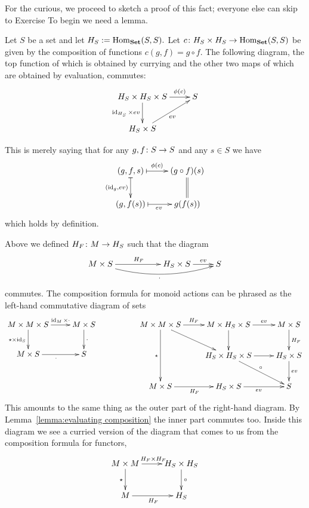 \documentclass[../main/CT4S-EN-RU]{subfiles}
\begin{document}
\begin{blockENG}
For the curious, we proceed to sketch a proof of this fact; everyone else can skip to Exercise %
To begin we need a lemma.
\end{blockENG}

\begin{blockRUS}
\end{blockRUS}

\begin{lemmaENG}\label{lemma:evaluating composition}
Let $S$ be a set and let $H_S:=\operatorname{Hom}_{\mathbf{Set}}(S,S).$ Let $c\colon H_S\times H_S\rightarrow\operatorname{Hom}_{\mathbf{Set}}(S,S)$ be given by the composition of functions $c(g,f)=g\circ f.$ The following diagram, the top function of which is obtained by currying and the other two maps of which are obtained by evaluation, commutes: 
$$
\xymatrix{H_S\times H_S\times S\ar[r]^-{\phi(c)}\ar[d]_{\id_{H_S}\times ev}&S\\H_S\times S\ar[ur]_{ev}}
$$
\end{lemmaENG}

\begin{lemmaRUS}\label{lemma:evaluating composition}
\end{lemmaRUS}

\begin{proofENG}
This is merely saying that for any $g,f\colon S\rightarrow S$ and any $s\in S$ we have 
$$
\xymatrix{(g,f,s)\ar@{|->}[r]^-{\phi(c)}\ar@{|->}[d]_{(\id_g,ev)}&(g\circ f)(s)\ar@{=}[d]\\(g,f(s))\ar@{|->}[r]_{ev}&g(f(s))}
$$
which holds by definition.
\end{proofENG}

\begin{proofRUS}
\end{proofRUS}

\begin{blockENG}
Above we defined $H_F\colon M\rightarrow H_S$ such that the diagram 
$$
\xymatrix{M\times S\ar[rr]^{H_F}\ar@/_1pc/[rrr]_{\cdot}&&H_S\times S\ar[r]^-{ev}&S}
$$
commutes. The composition formula for monoid actions can be phrased as the left-hand commutative diagram of sets
$$
\xymatrix{M\times M\times S\ar[r]^-{\id_M\times\cdot}\ar[d]_{\star\times\id_S}&M\times S\ar[d]^\cdot\\M\times S\ar[r]_\cdot&S}
\hspace{.7in}
\xymatrix@=25pt{
M\times M\times S\ar[rd]\ar[r]^-{H_F}\ar[dd]_{\star}&M\times H_S\times S\ar[d]\ar[r]^-{ev}&M\times S\ar[d]^{H_F}\\
&H_S\times H_S\times S\ar[r]\ar[rd]^\circ&H_S\times S\ar[d]^{ev}\\
M\times S\ar[r]_{H_F}&H_S\times S\ar[r]_{ev}&S}
$$
This amounts to the same thing as the outer part of the right-hand diagram. By Lemma~\ref{lemma:evaluating composition} the inner part commutes too. Inside this diagram we see a curried version of the diagram that comes to us from the composition formula for functors,
$$
\xymatrix{M\times M\ar[r]^{H_F\times H_F}\ar[d]_\star&H_S\times H_S\ar[d]^\circ\\M\ar[r]_{H_F}&H_S}
$$
\end{blockENG}
\end{document}
